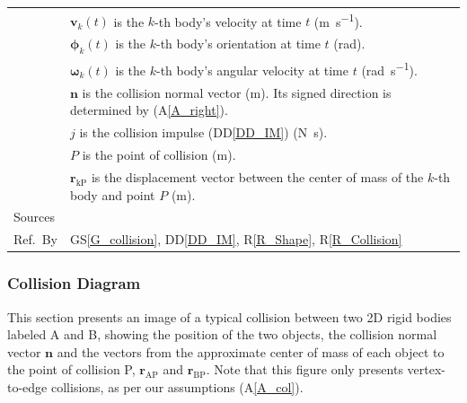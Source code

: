 \documentclass[12pt]{article}
\newcommand{\colAwidth}{0.13\textwidth}
\newcommand{\colBwidth}{0.82\textwidth}
\newcommand{\aref}[1]{A\ref{#1}}
\begin{document}
\begin{minipage}{\textwidth}
\begin{tabular}{| p{\colAwidth} | p{\colBwidth}|}
  & $\mathbf{v}_k(t)$ is the $k$-th body's velocity at time $t$ (\si{\metre\per\second}). \\
  & $\boldsymbol{\phi}_k(t)$ is the $k$-th body's orientation at time $t$ (\si{\radian}). \\
  & $\boldsymbol{\omega}_k(t)$ is the $k$-th body's angular velocity at time $t$ (\si{\radian\per\second}). \\
  & $\mathbf{n}$ is the collision normal vector (\si{\metre}). Its signed direction is determined by (\aref{A_right}). \\
  & $j$ is the collision impulse (DD\ref{DD_IM}) (\si{\newton\second}). \\
  & $P$ is the point of collision (\si{\metre}). \\
  & $\mathbf{r}_\mathrm{kP}$ is the displacement vector between the center of mass of the $k$-th body and point $P$ (\si{\metre}). \\
  \hline
  Sources & \\
  \hline
Ref.\ By & GS\ref{G_collision}, DD\ref{DD_IM}, R\ref{R_Shape}, R\ref{R_Collision} \\
  \hline
\end{tabular}
\end{minipage}

\subsubsection*{Collision Diagram}

This section presents an image of a typical collision between two 2D rigid bodies labeled A and B, showing the position of the two objects, the collision normal vector $\mathbf{n}$ and the vectors from the approximate center of mass of each object to the point of collision P, $\mathbf{r}_\mathrm{AP}$ and $\mathbf{r}_\mathrm{BP}$. Note that this figure only presents vertex-to-edge collisions, as per our assumptions (A\ref{A_col}).
\end{document}

